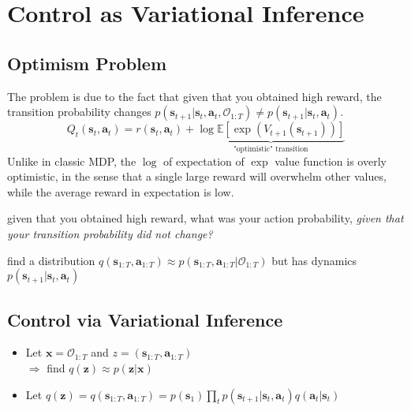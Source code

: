 \section{Control as Variational Inference}
\subsection{Optimism Problem}
The problem is due to the fact that given that you obtained high reward, the transition probability changes $p(\textbf{s}_{t+1} | \textbf{s}_t, \textbf{a}_t, \mathcal{O}_{1:T}) \neq p(\textbf{s}_{t+1} | \textbf{s}_t, \textbf{a}_t)$.
\begin{equation}
	Q_t(\textbf{s}_t, \textbf{a}_t) = r(\textbf{s}_t, \textbf{a}_t) + \underbrace{\log \mathbb{E} \left[ \exp ( V_{t+1}(\textbf{s}_{t+1}) ) \right]}_{\textstyle \text{"optimistic" transition}}
\end{equation}
Unlike in classic \ac{MDP}, the $\log$ of expectation of $\exp$ value function is overly optimistic, in the sense that a single large reward will overwhelm other values, while the average reward in expectation is low.

 given that you obtained high reward, what was your action probability, \textit{given that your transition probability did not change?}

 find a distribution $q(\textbf{s}_{1:T}, \textbf{a}_{1:T}) \approx p(\textbf{s}_{1:T}, \textbf{a}_{1:T} | \mathcal{O}_{1:T})$ but has dynamics $p(\textbf{s}_{t+1} | \textbf{s}_t, \textbf{a}_t)$

\subsection{Control via Variational Inference}
\begin{itemize}
	\item Let $\textbf{x} = \mathcal{O}_{1:T}$ and $z=(\textbf{s}_{1:T}, \textbf{a}_{1:T})$\\
	$\Rightarrow$ find $q(\textbf{z}) \approx p(\textbf{z}|\textbf{x})$
	\item Let $q(\textbf{z}) = q(\textbf{s}_{1:T}, \textbf{a}_{1:T}) = p(\textbf{s}_1) \prod_t p(\textbf{s}_{t+1} | \textbf{s}_t, \textbf{a}_t) q(\textbf{a}_t | \textbf{s}_t)$
\end{itemize}

